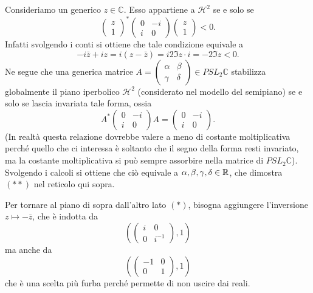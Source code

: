 \begin{osservazione}
	Consideriamo un generico $z\in\mathbb C$. Esso appartiene a $\mathcal H^{2}$ se e solo se 
	$$\begin{pmatrix}z \\ 1\end{pmatrix}^{*} \begin{pmatrix}0 & -i \\ i & 0\end{pmatrix} \begin{pmatrix}z \\ 1\end{pmatrix}<0.$$
	Infatti svolgendo i conti si ottiene che tale condizione equivale a 
	$$-i\bar z + iz = i(z-\bar z) = i2\Im z\cdot i = -2\Im z < 0.$$
	Ne segue che una generica matrice $A = \begin{pmatrix}\alpha & \beta \\ \gamma & \delta\end{pmatrix}\in PSL_{2}\mathbb C$ stabilizza globalmente il piano iperbolico $\mathcal H^{2}$ (considerato nel modello del semipiano) se e solo se lascia invariata tale forma, ossia 
	$$A^{*}\begin{pmatrix}0 & -i \\ i & 0\end{pmatrix}A = \begin{pmatrix}0 & -i \\ i & 0\end{pmatrix}.$$
	(In realtà questa relazione dovrebbe valere a meno di costante moltiplicativa perché quello che ci interessa è soltanto che il segno della forma resti invariato, ma la costante moltiplicativa si può sempre assorbire nella matrice di $PSL_{2}\mathbb C$).
	Svolgendo i calcoli si ottiene che ciò equivale a $\alpha, \beta,\gamma,\delta\in\mathbb{R}$, che dimostra $(**)$ nel reticolo qui sopra.
	
	Per tornare al piano di sopra dall'altro lato $(*)$, bisogna aggiungere l'inversione $z\mapsto -\bar z$, che è indotta da 
	$$\left(\begin{pmatrix}i & 0 \\ 0 & i^{-1}\end{pmatrix}, 1\right)$$
	ma anche da 
	$$\left(\begin{pmatrix}-1 & 0 \\ 0 & 1\end{pmatrix}, 1\right)$$
	che è una scelta più furba perché permette di non uscire dai reali.
\end{osservazione}


